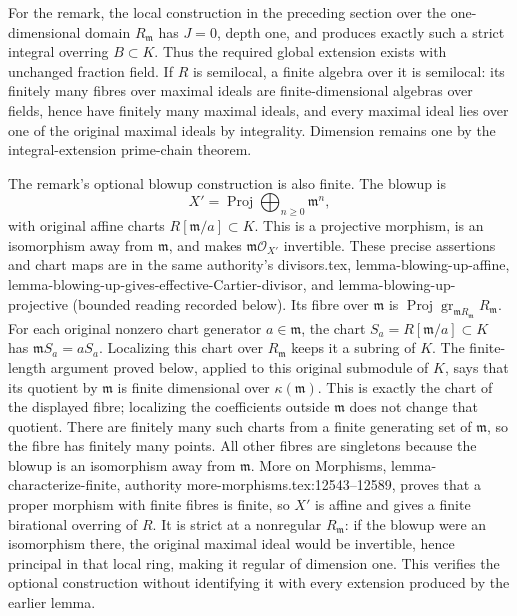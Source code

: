 For the remark, the local construction in the preceding section over the one-dimensional domain \(R_{\mathfrak m}\) has \(J=0\), depth one, and produces exactly such a strict integral overring \(B\subset K\). Thus the required global extension exists with unchanged fraction field. If \(R\) is semilocal, a finite algebra over it is semilocal: its finitely many fibres over maximal ideals are finite-dimensional algebras over fields, hence have finitely many maximal ideals, and every maximal ideal lies over one of the original maximal ideals by integrality. Dimension remains one by the integral-extension prime-chain theorem.

The remark's optional blowup construction is also finite. The blowup is \[
 X'=\operatorname{Proj}\bigoplus_{n\ge0}\mathfrak m^n,
\] with original affine charts \(R[\mathfrak m/a]\subset K\). This is a projective morphism, is an isomorphism away from \(\mathfrak m\), and makes \(\mathfrak m\mathcal O_{X'}\) invertible. These precise assertions and chart maps are in the same authority's divisors.tex, lemma-blowing-up-affine, lemma-blowing-up-gives-effective-Cartier-divisor, and lemma-blowing-up-projective (bounded reading recorded below). Its fibre over \(\mathfrak m\) is \(\operatorname{Proj}\operatorname{gr}_{\mathfrak mR_{\mathfrak m}}R_{\mathfrak m}\). For each original nonzero chart generator \(a\in\mathfrak m\), the chart \(S_a=R[\mathfrak m/a]\subset K\) has \(\mathfrak mS_a=aS_a\). Localizing this chart over \(R_{\mathfrak m}\) keeps it a subring of \(K\). The finite-length argument proved below, applied to this original submodule of \(K\), says that its quotient by \(\mathfrak m\) is finite dimensional over \(\kappa(\mathfrak m)\). This is exactly the chart of the displayed fibre; localizing the coefficients outside \(\mathfrak m\) does not change that quotient. There are finitely many such charts from a finite generating set of \(\mathfrak m\), so the fibre has finitely many points. All other fibres are singletons because the blowup is an isomorphism away from \(\mathfrak m\). More on Morphisms, lemma-characterize-finite, authority more-morphisms.tex:12543--12589, proves that a proper morphism with finite fibres is finite, so \(X'\) is affine and gives a finite birational overring of \(R\). It is strict at a nonregular \(R_{\mathfrak m}\): if the blowup were an isomorphism there, the original maximal ideal would be invertible, hence principal in that local ring, making it regular of dimension one. This verifies the optional construction without identifying it with every extension produced by the earlier lemma.

